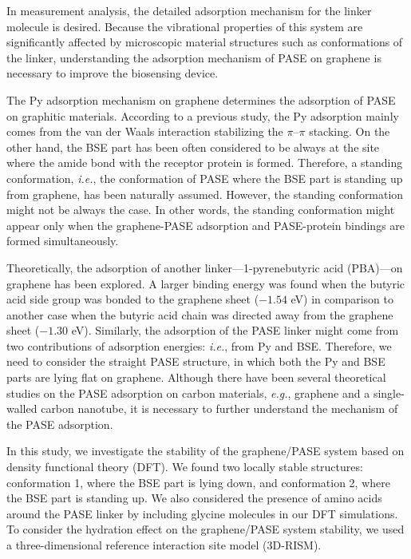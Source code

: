\documentclass[journal=acsodf,manuscript=article]{achemso}
\begin{document}
In measurement analysis, the detailed adsorption mechanism for the linker molecule is desired. Because the vibrational properties of this system are significantly affected by microscopic material structures such as conformations of the linker, understanding the adsorption mechanism of PASE on graphene is necessary to improve the biosensing device.

The Py adsorption mechanism on graphene determines the adsorption of PASE on graphitic materials.
According to a previous study\cite{singh2015noncovalently}, the Py adsorption mainly comes from the van der Waals interaction stabilizing the $\pi$--$\pi$ stacking. On the other hand, the BSE part has been often considered to be always at the site where the amide bond with the receptor protein is formed. Therefore, a standing conformation, {\it i.e.}, the conformation of PASE where the BSE part is standing up from graphene, has been naturally assumed\cite{chen2001noncovalent,katz1994application}.
However, the standing conformation might not be always the case. In other words, the standing conformation might appear only when the graphene-PASE adsorption and PASE-protein bindings are formed simultaneously. 

Theoretically, the adsorption of another linker---1-pyrenebutyric acid (PBA)---on graphene has been explored\cite{thodkar2021self,hinnemo2017monolayer,bailey2014study,li2013solvent}.
A larger binding energy was found when the butyric acid side group was bonded to the graphene sheet ($-1.54$ eV) in comparison to another case when the butyric acid chain was directed away from the graphene sheet ($-1.30$ eV)\cite{bailey2014study}.
Similarly, the adsorption of the PASE linker might come from two contributions of adsorption energies: {\it i.e.}, from Py and BSE. Therefore, we need to consider the straight PASE structure, in which both the Py and BSE parts are lying flat on graphene.
Although there have been several theoretical studies on the PASE adsorption on carbon materials, {\it e.g.}, graphene and a single-walled carbon nanotube\cite{bagherzadeh2021real,zakaria2015nanovector,karachevtsev2011noncovalent,fan2008structural}, it is necessary to further understand the mechanism of the PASE adsorption.

In this study, we investigate the stability of the graphene/PASE system based on density functional theory (DFT). We found two locally stable structures: conformation 1, where the BSE part is lying down, and conformation 2, where the BSE part is standing up. We also considered the presence of amino acids around the PASE linker by including glycine molecules in our DFT simulations. To consider the hydration effect on the graphene/PASE system stability, we used a three-dimensional reference interaction site model (3D-RISM)\cite{kovalenko1998three,sato2000self}.
\end{document}

